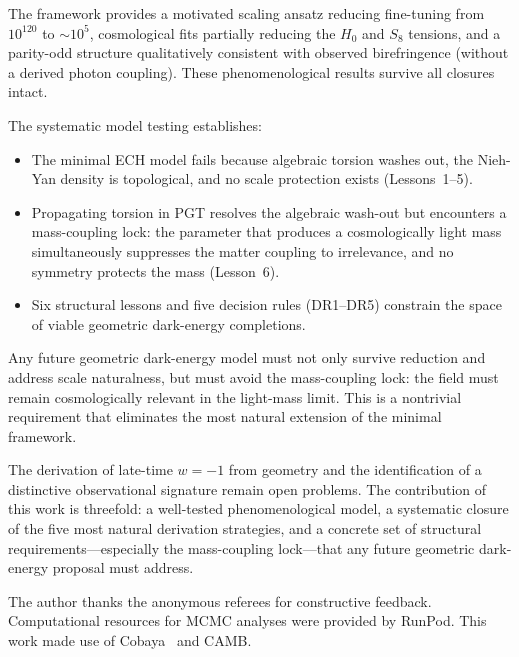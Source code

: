 \documentclass[aps,prd,twocolumn,superscriptaddress,showpacs,preprintnumbers,
  nofootinbib,longbibliography,floatfix]{revtex4-2}
\begin{document}
The framework provides a motivated scaling ansatz reducing fine-tuning
from $10^{120}$ to $\sim\!10^5$, cosmological fits partially reducing
the $H_0$ and $S_8$ tensions, and a parity-odd structure qualitatively
consistent with observed birefringence (without a derived photon
coupling). These phenomenological results survive all closures intact.

The systematic model testing establishes:
\begin{itemize}[leftmargin=*]
  \item The minimal ECH model fails because algebraic torsion washes
    out, the Nieh-Yan density is topological, and no scale protection
    exists (Lessons~1--5).
  \item Propagating torsion in PGT resolves the algebraic wash-out but
    encounters a mass-coupling lock: the parameter that produces a
    cosmologically light mass simultaneously suppresses the matter
    coupling to irrelevance, and no symmetry protects the mass
    (Lesson~6).
  \item Six structural lessons and five decision rules (DR1--DR5)
    constrain the space of viable geometric dark-energy completions.
\end{itemize}

Any future geometric dark-energy model must not only survive reduction
and address scale naturalness, but must avoid the mass-coupling lock:
the field must remain cosmologically relevant in the light-mass limit.
This is a nontrivial requirement that eliminates the most natural
extension of the minimal framework.

The derivation of late-time $w = -1$ from geometry and the identification
of a distinctive observational signature remain open problems. The
contribution of this work is threefold: a well-tested phenomenological
model, a systematic closure of the five most natural derivation
strategies, and a concrete set of structural requirements---especially
the mass-coupling lock---that any future geometric dark-energy proposal
must address.


\begin{acknowledgments}
The author thanks the anonymous referees for constructive feedback.
Computational resources for MCMC analyses were provided by RunPod.
This work made use of Cobaya~\cite{Cobaya2021} and CAMB.
\end{acknowledgments}
\end{document}
